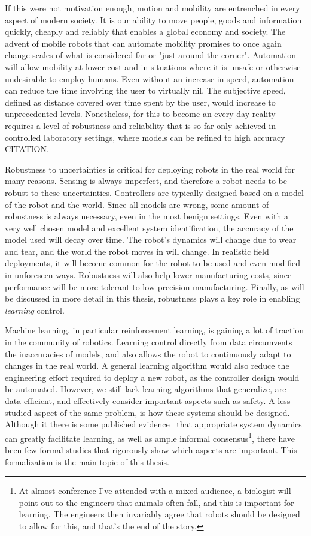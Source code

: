 If this were not motivation enough, motion and mobility are entrenched in every aspect of modern society. It is our ability to move people, goods and information quickly, cheaply and reliably that enables a global economy and society. The advent of mobile robots that can automate mobility promises to once again change scales of what is considered far or "just around the corner". Automation will allow mobility at lower cost and in situations where it is unsafe or otherwise undesirable to employ humans. Even without an increase in speed, automation can reduce the time involving the user to virtually nil. The subjective speed, defined as distance covered over time spent by the user, would increase to unprecedented levels. Nonetheless, for this to become an every-day reality requires a level of robustness and reliability that is so far only achieved in controlled laboratory settings, where models can be refined to high accuracy CITATION. \par

Robustness to uncertainties is critical for deploying robots in the real world for many reasons.
Sensing is always imperfect, and therefore a robot needs to be robust to these uncertainties.
Controllers are typically designed based on a model of the robot and the world. Since all models are wrong, some amount of robustness is always necessary, even in the most benign settings.
Even with a very well chosen model and excellent system identification, the accuracy of the model used will decay over time.
The robot's dynamics will change due to wear and tear, and the world the robot moves in will change.
In realistic field deployments, it will become common for the robot to be used and even modified in unforeseen ways.
Robustness will also help lower manufacturing costs, since performance will be more tolerant to low-precision manufacturing.
Finally, as will be discussed in more detail in this thesis, robustness plays a key role in enabling \emph{learning} control.
\par
Machine learning, in particular reinforcement learning, is gaining a lot of traction in the community of robotics. Learning control directly from data circumvents the inaccuracies of models, and also allows the robot to continuously adapt to changes in the real world.
A general learning algorithm would also reduce the engineering effort required to deploy a new robot, as the controller design would be automated.
However, we still lack learning algorithms that generalize, are data-efficient, and effectively consider important aspects such as safety.
A less studied aspect of the same problem, is how these systems should be designed. Although it there is some published evidence~\cite{tedrake2005learning, randlov2000shaping} that appropriate system dynamics can greatly facilitate learning, as well as ample informal consensus\footnote{At almost conference I've attended with a mixed audience, a biologist will point out to the engineers that animals often fall, and this is important for learning. The engineers then invariably agree that robots should be designed to allow for this, and that's the end of the story.}, there have been few formal studies that rigorously show which aspects are important. This formalization is the main topic of this thesis.

